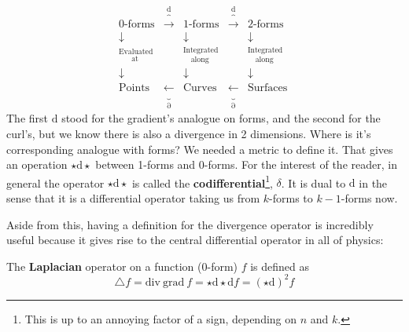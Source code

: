 \documentclass[../master.tex]{subfiles}
\begin{document}
		\begin{equation*}
			~~~~~~
			\begin{matrix}
				\text{0-forms} & \overbrace{\longrightarrow}^\mathrm d & 
				\text{1-forms} & \overbrace{\longrightarrow}^\mathrm d & 
				\text{2-forms}  \\
				\downarrow & & \downarrow & & \downarrow \\
				^{\text{Evaluated}}_{\text{~~~~~at}} & & 
				^{\text{Integrated}}_{\text{~~~along}} & &
				^{\text{Integrated}}_{\text{~~~along}} & &\\
				\downarrow & & \downarrow & & \downarrow \\
				\text{Points} & \underbrace{\longleftarrow}_\partial & 
				\text{Curves} & \underbrace{\longleftarrow}_\partial & 
				\text{Surfaces} 
			
			\end{matrix}
		\end{equation*}
		The first $\mathrm d$ stood for the gradient's analogue on forms, and the second for the curl's, but we know there is also a divergence in 2 dimensions. Where is it's corresponding analogue with forms? We needed a metric to define it. That gives an operation $\star \mathrm d \star$ between 1-forms and 0-forms. For the interest of the reader, in general the operator $\star \mathrm d \star$ is called the \textbf{codifferential}\footnote{This is up to an annoying factor of a sign, depending on $n$ and $k$.}, $\delta$. It is dual to $\mathrm d$ in the sense that it is a differential operator taking us from $k$-forms to $k-1$-forms now. 
	
	Aside from this, having a definition for the divergence operator is incredibly useful because it gives rise to the central differential operator in all of physics:
	
	\begin{defn}
		The \textbf{Laplacian} operator on a function (0-form) $f$ is defined as 
		\begin{equation}
			\triangle f = \mathrm{div} ~ \mathrm{grad} ~ f 
			= \star \mathrm d \star \mathrm d f
			= (\star \mathrm d)^2 f
		\end{equation}
	\end{defn}
	
\end{document}
